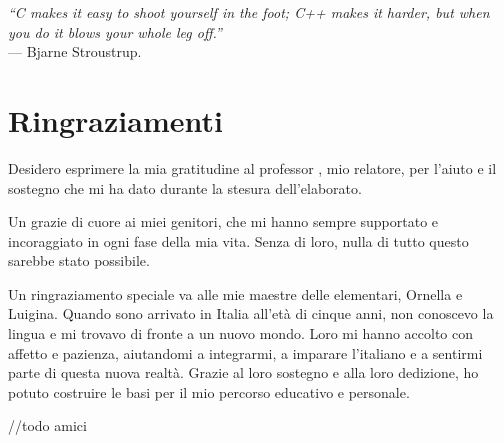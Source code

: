 \cleardoublepage
{}
{}

\begin{flushright}{
    \slshape
    ``C makes it easy to shoot yourself in the foot; C++ makes it harder, but when you do it blows your whole leg off.''} \\
    \medskip
    --- Bjarne Stroustrup.
\end{flushright}


\begingroup
\let\clearpage\relax
\let\cleardoublepage\relax
\let\cleardoublepage\relax

\chapter*{Ringraziamenti}

\noindent Desidero esprimere la mia gratitudine al professor \myProf, mio relatore, per l'aiuto e il sostegno che mi ha dato durante la stesura dell'elaborato.

\vspace{0.35cm}

\noindent Un grazie di cuore ai miei genitori, che mi hanno sempre supportato e incoraggiato in ogni fase della mia vita. Senza di loro, nulla di tutto questo sarebbe stato possibile.

\vspace{0.35cm}

\noindent Un ringraziamento speciale va alle mie maestre delle elementari, Ornella e Luigina. Quando sono arrivato in Italia all'età di cinque anni, non conoscevo la lingua e mi trovavo di fronte a un nuovo mondo. Loro mi hanno accolto con affetto e pazienza, aiutandomi a integrarmi, a imparare l'italiano e a sentirmi parte di questa nuova realtà. Grazie al loro sostegno e alla loro dedizione, ho potuto costruire le basi per il mio percorso educativo e personale.

\vspace{0.35cm}

//todo amici

\vspace{0.75cm}

\noindent{\myLocation, \myTime}
\hfill \textit{\myName}

\endgroup
